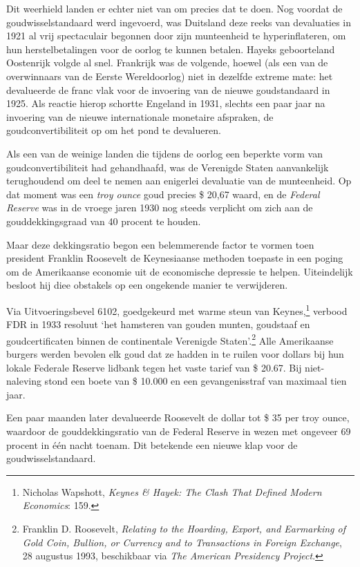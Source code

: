 \documentclass[
  a5paper,
  smalldemyvopaper,11pt,twoside,onecolumn,openright,extrafontsizes,
hidelinks]{memoir}
\begin{document}
Dit weerhield landen er echter niet van om precies dat te doen. Nog
voordat de goudwisselstandaard werd ingevoerd, was Duitsland deze reeks
van devaluaties in 1921 al vrij spectaculair begonnen door zijn
munteenheid te hyperinflateren, om hun herstelbetalingen voor de oorlog
te kunnen betalen. Hayeks geboorteland Oostenrijk volgde al snel.
Frankrijk was de volgende, hoewel (als een van de overwinnaars van de
Eerste Wereldoorlog) niet in dezelfde extreme mate: het devalueerde de
franc vlak voor de invoering van de nieuwe goudstandaard in 1925. Als
reactie hierop schortte Engeland in 1931, slechts een paar jaar na
invoering van de nieuwe internationale monetaire afspraken, de
goudconvertibiliteit op om het pond te devalueren.

Als een van de weinige landen die tijdens de oorlog een beperkte vorm
van goudconvertibiliteit had gehandhaafd, was de Verenigde Staten
aanvankelijk terughoudend om deel te nemen aan enigerlei devaluatie van
de munteenheid. Op dat moment was een \emph{troy ounce} goud precies \$
20,67 waard, en de \emph{Federal Reserve} was in de vroege jaren 1930
nog steeds verplicht om zich aan de gouddekkingsgraad van 40 procent te
houden.

Maar deze dekkingsratio begon een belemmerende factor te vormen toen
president Franklin Roosevelt de Keynesiaanse methoden toepaste in een
poging om de Amerikaanse economie uit de economische depressie te
helpen. Uiteindelijk besloot hij diee obstakels op een ongekende manier
te verwijderen.

Via Uitvoeringsbevel 6102, goedgekeurd met warme steun van
Keynes,\footnote{\hspace{0pt}Nicholas Wapshott, \emph{Keynes \& Hayek:
  The Clash That Defined Modern Economics}: 159.} verbood FDR in 1933
resoluut `het hamsteren van gouden munten, goudstaaf en goudcertificaten
binnen de continentale Verenigde Staten'.\footnote{\hspace{0pt}Franklin
  D. Roosevelt, \emph{Relating to the Hoarding, Export, and Earmarking
  of Gold Coin, Bullion, or Currency and to Transactions in Foreign
  Exchange}, 28 augustus 1993, beschikbaar via \emph{The American
  Presidency Project}.} Alle Amerikaanse burgers werden bevolen elk goud
dat ze hadden in te ruilen voor dollars bij hun lokale Federale Reserve
lidbank tegen het vaste tarief van \$ 20.67. Bij niet-naleving stond een
boete van \$ 10.000 en een gevangenisstraf van maximaal tien jaar.

Een paar maanden later devalueerde Roosevelt de dollar tot \$ 35 per
troy ounce, waardoor de gouddekkingsratio van de Federal Reserve in
wezen met ongeveer 69 procent in één nacht toenam. Dit betekende een
nieuwe klap voor de goudwisselstandaard.
\end{document}
